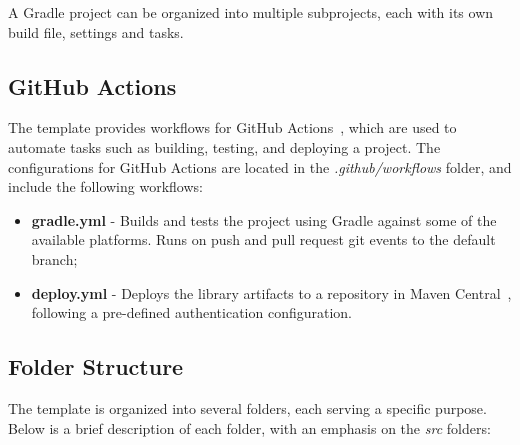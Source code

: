 A Gradle project can be organized into multiple subprojects, each with its own build file, settings and tasks.

\subsection{GitHub Actions}\label{subsec:github-actions}

The template provides workflows for GitHub Actions~\cite{github-actions}, which are used to automate tasks such as building, testing, and deploying a project.
The configurations for GitHub Actions are located in the \textit{.github/workflows} folder, and include the following workflows:

\begin{itemize}
    \item \textbf{gradle.yml} - Builds and tests the project using Gradle against some of the available platforms.
    Runs on push and pull request git events to the default branch;
    \item \textbf{deploy.yml} - Deploys the library artifacts to a repository in Maven Central~\cite{maven-central}, following a pre-defined authentication configuration.
\end{itemize}

\subsection{Folder Structure}\label{subsec:folder-structure}

The template is organized into several folders, each serving a specific purpose.
Below is a brief description of each folder, with an emphasis on the \textit{src} folders:

